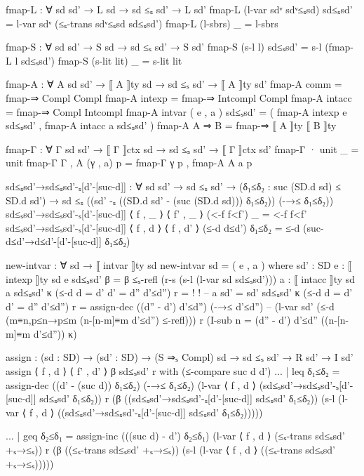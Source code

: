 \documentclass{article}
\begin{document}
\begin{prev}
\begin{code}
fmap-L : ∀ {sd sd'} → L sd → sd ≤ₛ sd' → L sd'
fmap-L (l-var sdᵛ sdᵛ≤ₛsd) sd≤ₛsd' = l-var sdᵛ (≤ₛ-trans sdᵛ≤ₛsd sd≤ₛsd')
fmap-L (l-sbrs) _ = l-sbrs 

fmap-S : ∀ {sd sd'} → S sd → sd ≤ₛ sd' → S sd'
fmap-S (s-l l) sd≤ₛsd' = s-l (fmap-L l sd≤ₛsd')
fmap-S (s-lit lit) _ = s-lit lit

fmap-A : ∀ {A sd sd'} → ⟦ A ⟧ty sd → sd ≤ₛ sd' → ⟦ A ⟧ty sd'
fmap-A {comm}  = fmap-⇒ {Compl} {Compl}
fmap-A {intexp} = fmap-⇒ {Intcompl} {Compl}
fmap-A {intacc} = fmap-⇒ {Compl} {Intcompl}
fmap-A {intvar} ( e , a ) sd≤ₛsd' = ( fmap-A {intexp} e sd≤ₛsd' , fmap-A {intacc} a sd≤ₛsd' )
fmap-A {A ⇒ B} = fmap-⇒ {⟦ A ⟧ty} {⟦ B ⟧ty}

fmap-Γ : ∀ {Γ sd sd'} → ⟦ Γ ⟧ctx sd → sd ≤ₛ sd' → ⟦ Γ ⟧ctx sd'
fmap-Γ {·} unit _ = unit
fmap-Γ {Γ , A} (γ , a) p = fmap-Γ γ p , fmap-A {A} a p


sd≤ₛsd'→sd≤ₛsd'-ₛ[d'-[suc-d]] : ∀ {sd sd'} → sd ≤ₛ sd' → (δ₁≤δ₂ : suc (SD.d sd) ≤ SD.d sd') → sd ≤ₛ ((sd' -ₛ ((SD.d sd' - (suc (SD.d sd))) δ₁≤δ₂)) (-→≤ δ₁≤δ₂))
sd≤ₛsd'→sd≤ₛsd'-ₛ[d'-[suc-d]] {⟨ f , _ ⟩} {⟨ f' , _ ⟩} (<-f f<f') _ = <-f f<f'
sd≤ₛsd'→sd≤ₛsd'-ₛ[d'-[suc-d]] {⟨ f , d ⟩} {⟨ f , d' ⟩} (≤-d d≤d') δ₁≤δ₂ = ≤-d (suc-d≤d'→d≤d'-[d'-[suc-d]] δ₁≤δ₂)

new-intvar : ∀ sd → ⟦ intvar ⟧ty sd
new-intvar sd = ( e , a )
    where
        sd' : SD
        e : ⟦ intexp ⟧ty sd
        e sd≤ₛsd' β = β ≤ₛ-refl (r-s (s-l (l-var sd sd≤ₛsd')))
        a : ⟦ intacc ⟧ty sd
        a sd≤ₛsd' κ (≤-d {d = d'} {d' = d''} d'≤d'') r = {!   !}
        -- a {sd' = sd'} sd≤ₛsd' κ (≤-d {d = d'} {d' = d''} d'≤d'') r = assign-dec ((d'' - d') d'≤d'') (-→≤ d'≤d'') 
        --     (l-var sd' (≤-d (m≡n,p≤n→p≤m (n-[n-m]≡m d'≤d'') ≤-refl))) r (I-sub {n = (d'' - d') d'≤d''} ((n-[n-m]≡m d'≤d'')) κ)

assign : (sd : SD) → (sd' : SD) → (S ⇒ₛ Compl) sd → sd ≤ₛ sd' → R sd' → I sd'
assign ⟨ f , d ⟩ ⟨ f' , d' ⟩ β sd≤ₛsd' r with (≤-compare {suc d} {d'})
... | leq δ₁≤δ₂ = assign-dec ((d' - (suc d)) δ₁≤δ₂) 
                    (-→≤ δ₁≤δ₂) (l-var ⟨ f , d ⟩ (sd≤ₛsd'→sd≤ₛsd'-ₛ[d'-[suc-d]] sd≤ₛsd' δ₁≤δ₂)) r 
                    (β ((sd≤ₛsd'→sd≤ₛsd'-ₛ[d'-[suc-d]] sd≤ₛsd' δ₁≤δ₂)) 
                        (s-l (l-var ⟨ f , d ⟩ ((sd≤ₛsd'→sd≤ₛsd'-ₛ[d'-[suc-d]] sd≤ₛsd' δ₁≤δ₂)))))


... | geq δ₂≤δ₁ = assign-inc (((suc d) - d') δ₂≤δ₁) 
                    (l-var ⟨ f , d ⟩ (≤ₛ-trans sd≤ₛsd' +ₛ→≤ₛ)) r 
                    (β ((≤ₛ-trans sd≤ₛsd' +ₛ→≤ₛ)) 
                        (s-l (l-var ⟨ f , d ⟩ ((≤ₛ-trans sd≤ₛsd' +ₛ→≤ₛ)))))


\end{code}
\end{prev}
\end{document}
